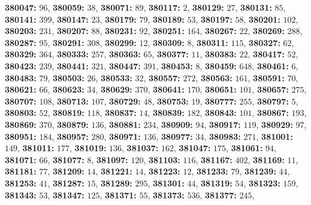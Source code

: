 \textsf{\bfseries 380047:} $96$, \textsf{\bfseries 380059:} $38$, \textsf{\bfseries 380071:} $89$, \textsf{\bfseries 380117:} $2$, \textsf{\bfseries 380129:} $27$, \textsf{\bfseries 380131:} $85$, \textsf{\bfseries 380141:} $399$, \textsf{\bfseries 380147:} $23$, \textsf{\bfseries 380179:} $79$, \textsf{\bfseries 380189:} $53$, \textsf{\bfseries 380197:} $58$, \textsf{\bfseries 380201:} $102$, \textsf{\bfseries 380203:} $231$, \textsf{\bfseries 380207:} $88$, \textsf{\bfseries 380231:} $92$, \textsf{\bfseries 380251:} $164$, \textsf{\bfseries 380267:} $22$, \textsf{\bfseries 380269:} $288$, \textsf{\bfseries 380287:} $95$, \textsf{\bfseries 380291:} $308$, \textsf{\bfseries 380299:} $12$, \textsf{\bfseries 380309:} $8$, \textsf{\bfseries 380311:} $115$, \textsf{\bfseries 380327:} $62$, \textsf{\bfseries 380329:} $364$, \textsf{\bfseries 380333:} $257$, \textsf{\bfseries 380363:} $65$, \textsf{\bfseries 380377:} $11$, \textsf{\bfseries 380383:} $22$, \textsf{\bfseries 380417:} $52$, \textsf{\bfseries 380423:} $239$, \textsf{\bfseries 380441:} $321$, \textsf{\bfseries 380447:} $391$, \textsf{\bfseries 380453:} $8$, \textsf{\bfseries 380459:} $648$, \textsf{\bfseries 380461:} $6$, \textsf{\bfseries 380483:} $79$, \textsf{\bfseries 380503:} $26$, \textsf{\bfseries 380533:} $32$, \textsf{\bfseries 380557:} $272$, \textsf{\bfseries 380563:} $161$, \textsf{\bfseries 380591:} $70$, \textsf{\bfseries 380621:} $66$, \textsf{\bfseries 380623:} $34$, \textsf{\bfseries 380629:} $370$, \textsf{\bfseries 380641:} $170$, \textsf{\bfseries 380651:} $101$, \textsf{\bfseries 380657:} $275$, \textsf{\bfseries 380707:} $108$, \textsf{\bfseries 380713:} $107$, \textsf{\bfseries 380729:} $48$, \textsf{\bfseries 380753:} $19$, \textsf{\bfseries 380777:} $255$, \textsf{\bfseries 380797:} $5$, \textsf{\bfseries 380803:} $52$, \textsf{\bfseries 380819:} $118$, \textsf{\bfseries 380837:} $14$, \textsf{\bfseries 380839:} $182$, \textsf{\bfseries 380843:} $101$, \textsf{\bfseries 380867:} $193$, \textsf{\bfseries 380869:} $370$, \textsf{\bfseries 380879:} $136$, \textsf{\bfseries 380881:} $234$, \textsf{\bfseries 380909:} $94$, \textsf{\bfseries 380917:} $119$, \textsf{\bfseries 380929:} $97$, \textsf{\bfseries 380951:} $184$, \textsf{\bfseries 380957:} $280$, \textsf{\bfseries 380971:} $136$, \textsf{\bfseries 380977:} $34$, \textsf{\bfseries 380983:} $271$, \textsf{\bfseries 381001:} $149$, \textsf{\bfseries 381011:} $177$, \textsf{\bfseries 381019:} $136$, \textsf{\bfseries 381037:} $162$, \textsf{\bfseries 381047:} $175$, \textsf{\bfseries 381061:} $94$, \textsf{\bfseries 381071:} $66$, \textsf{\bfseries 381077:} $8$, \textsf{\bfseries 381097:} $120$, \textsf{\bfseries 381103:} $116$, \textsf{\bfseries 381167:} $402$, \textsf{\bfseries 381169:} $11$, \textsf{\bfseries 381181:} $77$, \textsf{\bfseries 381209:} $14$, \textsf{\bfseries 381221:} $14$, \textsf{\bfseries 381223:} $12$, \textsf{\bfseries 381233:} $79$, \textsf{\bfseries 381239:} $44$, \textsf{\bfseries 381253:} $41$, \textsf{\bfseries 381287:} $15$, \textsf{\bfseries 381289:} $295$, \textsf{\bfseries 381301:} $44$, \textsf{\bfseries 381319:} $54$, \textsf{\bfseries 381323:} $159$, \textsf{\bfseries 381343:} $53$, \textsf{\bfseries 381347:} $125$, \textsf{\bfseries 381371:} $55$, \textsf{\bfseries 381373:} $536$, \textsf{\bfseries 381377:} $245$, 
